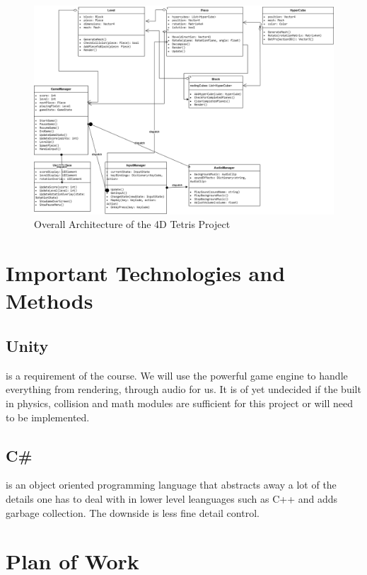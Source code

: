 \documentclass{article}
\begin{document}
\begin{figure}[H]
    \centering
    \includegraphics[width=\textwidth]{classes.png}
    \caption{Overall Architecture of the 4D Tetris Project}
    \label{fig:architecture}
\end{figure}

\section{Important Technologies and Methods}
\subsection{Unity} is a requirement of the course. We will use the powerful game engine to handle everything from rendering, through audio for us. It is of yet undecided if the built in physics, collision and math modules are sufficient for this project or will need to be implemented.
\subsection{C\#} is an object oriented programming language that abstracts away a lot of the details one has to deal with in lower level leanguages such as C++ and adds garbage collection. The downside is less fine detail control.


\section{Plan of Work}
\end{document}
